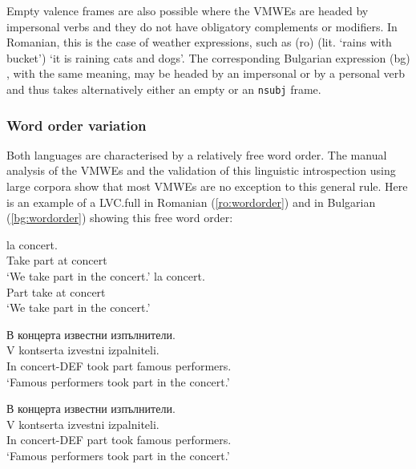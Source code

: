 \documentclass[output=paper,colorlinks,citecolor=brown]{langscibook}
\begin{document}
Empty valence frames are also possible where the VMWEs are headed by impersonal verbs and they do not have obligatory complements or modifiers. In Romanian, this is the case of weather expressions, %
such as (ro)  (lit. `rains with bucket') {`it is raining cats and dogs'}. The corresponding Bulgarian expression (bg) , with the same meaning, may be headed by an impersonal or by a personal verb and thus takes alternatively either an empty or an \texttt{nsubj} frame.


\subsubsection{Word order variation}

Both languages are characterised by a relatively free word order. The manual analysis of the VMWEs and the validation of this linguistic introspection using large corpora %
show that most VMWEs are no exception to this general rule. Here is an example of a LVC.full in Romanian (\ref{ro:wordorder}) and in Bulgarian (\ref{bg:wordorder}) showing this free word order:

\begin{exe}
 \ex \label{ro:wordorder}
\begin{xlist}
    \ex 
    \settowidth {}
    \gll {}  la concert.  \\ 
   Take part at concert\\ 
     `We take part in the concert.'
    \ex 
    \settowidth {}
    \gll {}  la concert. \\ 
    Part take at concert\\ 
     `We take part in the concert.'
\end{xlist}

\ex \label{bg:wordorder}
\begin{xlist}
    \ex 
    \settowidth {}
    \glll В концерта   известни изпълнители. \\ 
     V kontserta   izvestni izpalniteli. \\ 
   In concert-DEF took part famous performers.\\ 
   \glt  `Famous performers took part in the concert.'

    \ex 
    \settowidth {}
    \glll В концерта   известни изпълнители. \\ 
    V kontserta   izvestni izpalniteli. \\ 
    In concert-DEF part took famous performers.\\ 
    \glt `Famous performers took part in the concert.'
\end{xlist}
\end{exe}
\end{document}
